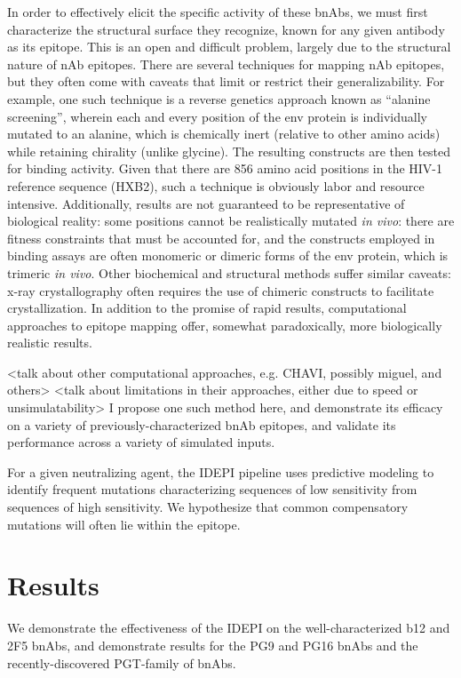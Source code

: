 \documentclass[10pt]{article}
\newcommand{\idepi}{{IDEPI}}
\newcommand{\hiv}{{HIV}-1}
\begin{document}
In order to effectively elicit the specific activity of these bnAbs,
we must first characterize the structural surface they recognize,
known for any given antibody as its epitope.
This is an open and difficult problem, largely due to the structural nature of nAb epitopes.
There are several techniques for mapping nAb epitopes, but they often come with caveats that limit or restrict their generalizability.
For example, one such technique is a reverse genetics approach known as “alanine screening”,
wherein each and every position of the env protein is individually mutated to an alanine,
which is chemically inert (relative to other amino acids) while retaining chirality (unlike glycine).
The resulting constructs are then tested for binding activity.
Given that there are 856 amino acid positions in the \hiv{} reference sequence ({HXB2}),
such a technique is obviously labor and resource intensive.
Additionally, results are not guaranteed to be representative of biological reality:
some positions cannot be realistically mutated \emph{in vivo}:
there are fitness constraints that must be accounted for,
and the constructs employed in binding assays are often monomeric or dimeric forms of the env protein, which is trimeric \emph{in vivo}.
Other biochemical and structural methods suffer similar caveats:
x-ray crystallography often requires the use of chimeric constructs to facilitate crystallization.
In addition to the promise of rapid results, computational approaches to epitope mapping offer, somewhat paradoxically, more biologically realistic results.

<talk about other computational approaches, e.g. CHAVI, possibly miguel, and others>
<talk about limitations in their approaches, either due to speed or unsimulatability> I propose one such method here, and demonstrate its efficacy on a variety of previously-characterized bnAb epitopes, and validate its performance across a variety of simulated inputs.

For a given neutralizing agent,
the \idepi{} pipeline uses predictive modeling to identify frequent mutations characterizing sequences of low sensitivity from sequences of high sensitivity.
We hypothesize that common compensatory mutations will often lie within the epitope.

\section*{Results}

We demonstrate the effectiveness of the \idepi{} on the well-characterized b12 and 2F5 bnAbs,
and demonstrate results for the PG9 and PG16 bnAbs and the recently-discovered PGT-family of bnAbs.
\end{document}
